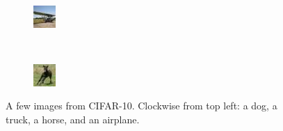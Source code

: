 \documentclass[12pt]{article}
\begin{document}
\begin{figure}
\begin{subfigure}[b]{0.15\textwidth}
    \end{subfigure}
    \\ 
    \begin{subfigure}[b]{0.15\textwidth}
        \includegraphics[width=\textwidth]{image5.jpeg}
    \end{subfigure}
    ~
    \begin{subfigure}[b]{0.15\textwidth}
        \includegraphics[width=\textwidth]{image6.jpeg}
    \end{subfigure}
    \caption{A few images from CIFAR-10. Clockwise from top left: a dog, a truck, a horse, and an airplane.}
    \label{fig:cifar10_images}
\end{figure}
\end{document}
